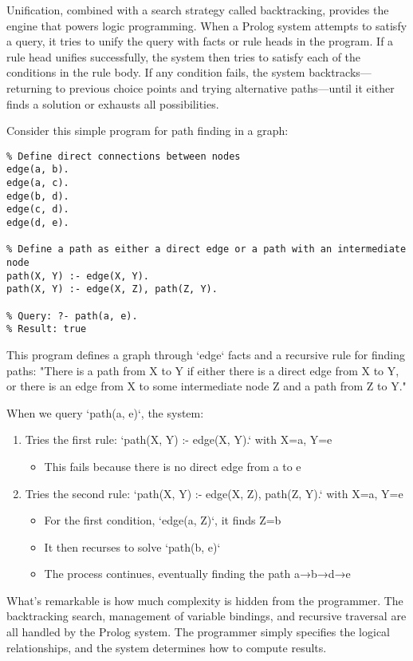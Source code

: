 \documentclass[11pt]{article}
\begin{document}
Unification, combined with a search strategy called backtracking, provides the engine that powers logic programming. When a Prolog system attempts to satisfy a query, it tries to unify the query with facts or rule heads in the program. If a rule head unifies successfully, the system then tries to satisfy each of the conditions in the rule body. If any condition fails, the system backtracks—returning to previous choice points and trying alternative paths—until it either finds a solution or exhausts all possibilities.

Consider this simple program for path finding in a graph:

\begin{verbatim}
% Define direct connections between nodes
edge(a, b).
edge(a, c).
edge(b, d).
edge(c, d).
edge(d, e).

% Define a path as either a direct edge or a path with an intermediate node
path(X, Y) :- edge(X, Y).
path(X, Y) :- edge(X, Z), path(Z, Y).

% Query: ?- path(a, e).
% Result: true
\end{verbatim}

This program defines a graph through `edge` facts and a recursive rule for finding paths: "There is a path from X to Y if either there is a direct edge from X to Y, or there is an edge from X to some intermediate node Z and a path from Z to Y."

When we query `path(a, e)`, the system:

\begin{enumerate}
\item Tries the first rule: `path(X, Y) :- edge(X, Y).` with X=a, Y=e
\begin{itemize}
\item This fails because there is no direct edge from a to e
\end{itemize}

\item Tries the second rule: `path(X, Y) :- edge(X, Z), path(Z, Y).` with X=a, Y=e
\begin{itemize}
\item For the first condition, `edge(a, Z)`, it finds Z=b
\item It then recurses to solve `path(b, e)`
\item The process continues, eventually finding the path a→b→d→e
\end{itemize}
\end{enumerate}

What's remarkable is how much complexity is hidden from the programmer. The backtracking search, management of variable bindings, and recursive traversal are all handled by the Prolog system. The programmer simply specifies the logical relationships, and the system determines how to compute results.
\end{document}
